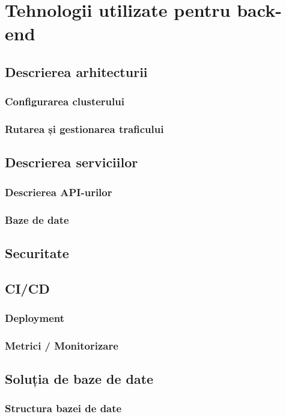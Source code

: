 \chapter{Tehnologii utilizate pentru back-end}
\label{sec:proj-backend}
\section{Descrierea arhitecturii}
\subsection{Configurarea clusterului}
\subsection{Rutarea și gestionarea traficului}

\section{Descrierea serviciilor}
\subsection{Descrierea API-urilor}

\subsection{Baze de date}

\section{Securitate}

\section{CI/CD}
\subsection{Deployment}
\subsection{Metrici / Monitorizare}


\section{Soluția de baze de date}
\label{sec:proj-database}
\subsection{Structura bazei de date}
